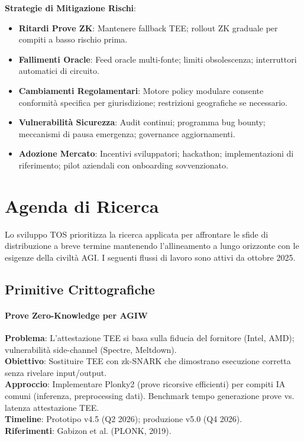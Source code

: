 \documentclass[11pt]{article}
\begin{document}
\begin{itemize}[noitemsep]
\textbf{Strategie di Mitigazione Rischi}:
\begin{itemize}[noitemsep]
  \item \textbf{Ritardi Prove ZK}: Mantenere fallback TEE; rollout ZK graduale per compiti a basso rischio prima.
  \item \textbf{Fallimenti Oracle}: Feed oracle multi-fonte; limiti obsolescenza; interruttori automatici di circuito.
  \item \textbf{Cambiamenti Regolamentari}: Motore policy modulare consente conformità specifica per giurisdizione; restrizioni geografiche se necessario.
  \item \textbf{Vulnerabilità Sicurezza}: Audit continui; programma bug bounty; meccanismi di pausa emergenza; governance aggiornamenti.
  \item \textbf{Adozione Mercato}: Incentivi sviluppatori; hackathon; implementazioni di riferimento; pilot aziendali con onboarding sovvenzionato.
\end{itemize}

\section{Agenda di Ricerca}
\label{sec:research}

Lo sviluppo TOS prioritizza la ricerca applicata per affrontare le sfide di distribuzione a breve termine mantenendo l'allineamento a lungo orizzonte con le esigenze della civiltà AGI. I seguenti flussi di lavoro sono attivi da ottobre 2025.

\subsection{Primitive Crittografiche}

\paragraph{Prove Zero-Knowledge per AGIW}
\textbf{Problema}: L'attestazione TEE si basa sulla fiducia del fornitore (Intel, AMD); vulnerabilità side-channel (Spectre, Meltdown).\\
\textbf{Obiettivo}: Sostituire TEE con zk-SNARK che dimostrano esecuzione corretta senza rivelare input/output.\\
\textbf{Approccio}: Implementare Plonky2 (prove ricorsive efficienti) per compiti IA comuni (inferenza, preprocessing dati). Benchmark tempo generazione prove vs. latenza attestazione TEE.\\
\textbf{Timeline}: Prototipo v4.5 (Q2 2026); produzione v5.0 (Q4 2026).\\
\textbf{Riferimenti}: Gabizon et al. (PLONK, 2019).


\end{itemize}
\end{document}
